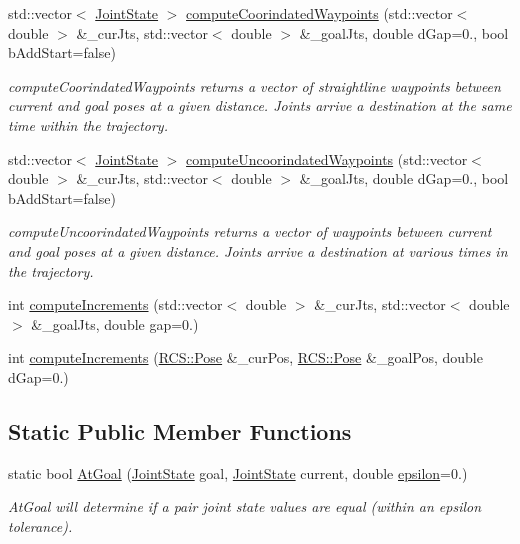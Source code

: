 \begin{DoxyCompactItemize}
std\-::vector$<$ \hyperlink{RCS_8h_aa4adb93a26caa4dacba9c9614e283245}{Joint\-State} $>$ \hyperlink{classMotionControl_aebf1d77a70bbf6817f0899a98173b87d}{compute\-Coorindated\-Waypoints} (std\-::vector$<$ double $>$ \&\-\_\-cur\-Jts, std\-::vector$<$ double $>$ \&\-\_\-goal\-Jts, double d\-Gap=0., bool b\-Add\-Start=false)
\begin{DoxyCompactList}\small\item\em compute\-Coorindated\-Waypoints returns a vector of straightline waypoints between current and goal poses at a given distance. Joints arrive a destination at the same time within the trajectory. \end{DoxyCompactList}\item 
std\-::vector$<$ \hyperlink{RCS_8h_aa4adb93a26caa4dacba9c9614e283245}{Joint\-State} $>$ \hyperlink{classMotionControl_a5a7f01d81030676aab106b7bf4c60aa6}{compute\-Uncoorindated\-Waypoints} (std\-::vector$<$ double $>$ \&\-\_\-cur\-Jts, std\-::vector$<$ double $>$ \&\-\_\-goal\-Jts, double d\-Gap=0., bool b\-Add\-Start=false)
\begin{DoxyCompactList}\small\item\em compute\-Uncoorindated\-Waypoints returns a vector of waypoints between current and goal poses at a given distance. Joints arrive a destination at various times in the trajectory. \end{DoxyCompactList}\item 
int \hyperlink{classMotionControl_ac065f800e86df7a771aae2aa4271aaa3}{compute\-Increments} (std\-::vector$<$ double $>$ \&\-\_\-cur\-Jts, std\-::vector$<$ double $>$ \&\-\_\-goal\-Jts, double gap=0.)
\item 
int \hyperlink{classMotionControl_a1dbb240abf15324af65904bfba39bd41}{compute\-Increments} (\hyperlink{namespaceRCS_aa07e45d8a50e30064283d2b38087f999}{R\-C\-S\-::\-Pose} \&\-\_\-cur\-Pos, \hyperlink{namespaceRCS_aa07e45d8a50e30064283d2b38087f999}{R\-C\-S\-::\-Pose} \&\-\_\-goal\-Pos, double d\-Gap=0.)
\end{DoxyCompactItemize}
\subsection*{Static Public Member Functions}
\begin{DoxyCompactItemize}
\item 
static bool \hyperlink{classMotionControl_a57fb4b492bc50f10b4fd5e068bda4f7a}{At\-Goal} (\hyperlink{RCS_8h_aa4adb93a26caa4dacba9c9614e283245}{Joint\-State} goal, \hyperlink{RCS_8h_aa4adb93a26caa4dacba9c9614e283245}{Joint\-State} current, double \hyperlink{classMotionControl_ad3cadb7d245794540e4a320ee560b6b2}{epsilon}=0.)
\begin{DoxyCompactList}\small\item\em At\-Goal will determine if a pair joint state values are equal (within an epsilon tolerance). \end{DoxyCompactList}\end{DoxyCompactItemize}
